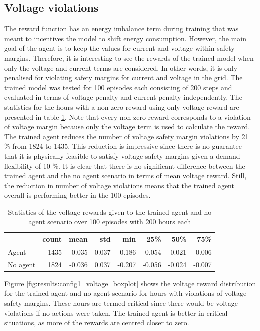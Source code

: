 \documentclass[class=book, crop=false]{standalone}
\begin{document}
\subsection{Voltage violations}
The reward function has an energy imbalance term during training that was meant to incentives the model to shift energy consumption. However, the main goal of the agent is to keep the values for current and voltage within safety margins. Therefore, it is interesting to see the rewards of the trained model when only the voltage and current terms are considered. In other words, it is only penalised for violating safety margins for current and voltage in the grid. The trained model was tested for 100 episodes each consisting of 200 steps and evaluated
in terms of voltage penalty and current penalty independently. The statistics for the hours with a non-zero reward using only voltage reward are presented in table \ref{table:results:configuration1_reward_100_episodes}. Note that every non-zero reward corresponds to a violation of voltage margin because only the voltage term is used to calculate the reward. The trained agent reduces the number of voltage safety margin violations by 21 \% from 1824 to 1435. This reduction is impressive since there is no guarantee that it is physically feasible to satisfy voltage safety margins given a demand flexibility of 10 \%. It is clear that there is no significant difference between the trained agent and the no agent scenario in terms of mean voltage reward. Still, the reduction in number of voltage violations means that the trained agent overall is performing better in the 100 episodes. 
\begin{table}[ht]
\center
\begin{tabular}{l|rrrrrrr}
         & count & mean   & std   & min    & 25\%   & 50\%   & 75\%   \\
\hline
Agent    & 1435  & -0.035 & 0.037 & -0.186 & -0.054 & -0.021 & -0.006 \\
No agent & 1824  & -0.036 & 0.037 & -0.207 & -0.056 & -0.024 & -0.007 \\
\hline
\end{tabular}
\caption{Statistics of the voltage rewards given to the trained agent and no agent scenario over 100 episodes with 200 hours each}
\label{table:results:configuration1_reward_100_episodes}
\end{table}

Figure \ref{fig:results:config1_voltage_boxplot} shows the voltage reward distribution for the trained agent and no agent scenario for hours with violations of voltage safety margins. These hours are termed critical since there would be voltage violations if no actions were taken. The trained agent is better in critical situations, as more of the rewards are centred closer to zero.
\end{document}
